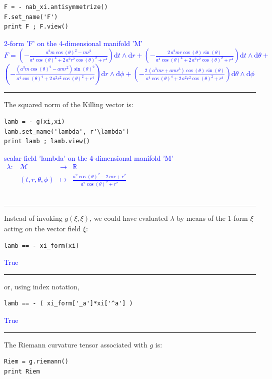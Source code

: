 \documentclass[a4paper]{jpconf}
\newcommand{\soutput}[1]{\textcolor{blue}{#1}\\[-0.8ex]\rule{\textwidth}{0.4pt}}
\begin{document}
\begin{verbatim}
F = - nab_xi.antisymmetrize()
F.set_name('F')
print F ; F.view()
\end{verbatim}
\soutput{2-form 'F' on the 4-dimensional manifold 'M'\\[1ex]
$F = \left( -\frac{a^{2} m \cos\left(\theta\right)^{2} - m r^{2}}{a^{4}
\cos\left(\theta\right)^{4} + 2 \, a^{2} r^{2}
\cos\left(\theta\right)^{2} + r^{4}} \right) \mathrm{d} t\wedge
\mathrm{d} r + \left( -\frac{2 \, a^{2} m r \cos\left(\theta\right)
\sin\left(\theta\right)}{a^{4} \cos\left(\theta\right)^{4} + 2 \, a^{2}
r^{2} \cos\left(\theta\right)^{2} + r^{4}} \right) \mathrm{d} t\wedge
\mathrm{d} \theta + $\\
$\left( -\frac{{\left(a^{3} m
\cos\left(\theta\right)^{2} - a m r^{2}\right)}
\sin\left(\theta\right)^{2}}{a^{4} \cos\left(\theta\right)^{4} + 2 \,
a^{2} r^{2} \cos\left(\theta\right)^{2} + r^{4}} \right) \mathrm{d}
r\wedge \mathrm{d} \phi + \left( -\frac{2 \, {\left(a^{3} m r + a m
r^{3}\right)} \cos\left(\theta\right) \sin\left(\theta\right)}{a^{4}
\cos\left(\theta\right)^{4} + 2 \, a^{2} r^{2}
\cos\left(\theta\right)^{2} + r^{4}} \right) \mathrm{d} \theta\wedge
\mathrm{d} \phi$}
The squared norm of the Killing vector is:
\begin{verbatim}
lamb = - g(xi,xi)
lamb.set_name('lambda', r'\lambda')
print lamb ; lamb.view()
\end{verbatim}
\soutput{scalar field 'lambda' on the 4-dimensional manifold 'M'\\[1ex]
$\begin{array}{llcl} \lambda:& \mathcal{M} & \longrightarrow
& \mathbb{R} \\ & \left(t, r, \theta, \phi\right) & \longmapsto
& \frac{a^{2} \cos\left(\theta\right)^{2} - 2 \, m r + r^{2}}{a^{2}
\cos\left(\theta\right)^{2} + r^{2}} \end{array}$\\[-1ex]}
Instead of invoking $g(\xi,\xi)$, we could have evaluated $\lambda$ 
by means of the 1-form $\underline{\xi}$ acting on the vector field $\xi$:
\begin{verbatim}
lamb == - xi_form(xi)
\end{verbatim}
\soutput{True}
or, using index notation,
\begin{verbatim}
lamb == - ( xi_form['_a']*xi['^a'] )
\end{verbatim}
\soutput{True}
The Riemann curvature tensor associated with $g$ is:
\begin{verbatim}
Riem = g.riemann()
print Riem
\end{verbatim}
\end{document}
